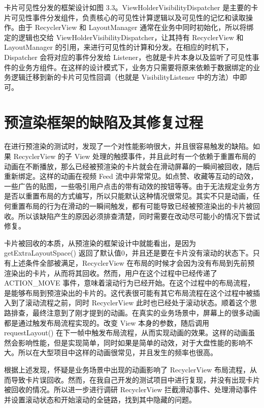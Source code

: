 
卡片可见性分发的框架设计如图 3.3。ViewHolderVisibilityDispatcher 是主要的卡片可见性事件分发组件，负责核心的可见性计算逻辑以及可见性的记忆和读取操作。由于 RecyclerView 和 LayoutManager 通常在业务中同时初始化，所以将绑定的逻辑也交给 ViewHolderVisibilityDispatcher，让其持有 RecyclerView 和 LayoutManager 的引用，来进行可见性的计算和分发。在相应的时机下，Dispatcher 会将对应的事件分发给 Listener，也就是卡片本身以及监听了可见性事件的业务方组件。在这样的设计模式下，业务方只需要将原来依赖于数据绑定的业务逻辑迁移到新的卡片可见性回调（也就是 VisibilityListener 中的方法）中即可。

\section{预渲染框架的缺陷及其修复过程}

在进行预渲染的测试时，发现了一个对性能影响很大，并且很容易触发的缺陷。如果 RecyclerView 的子 View 处理的触摸事件，并且此时有一个依赖于重置布局的动画在不断播放，那么已经被预渲染的卡片就会在滑动屏幕的一瞬间被回收，随后重新绑定。这样的动画在视频 Feed 流中非常常见。如点赞、收藏等互动的动效，一些广告的贴图，一些吸引用户点击的带有动效的按钮等等。由于无法规定业务方是否以重置布局的方式编写，所以只能默认这种情况很常见。其实不只是动画，任何重置布局的行为在滑动的一瞬间触发，都有可能导致已经被预渲染出的卡片被回收。所以该缺陷产生的原因必须排查清楚，同时需要在改动尽可能小的情况下尝试修复。

卡片被回收的本质，从预渲染的框架设计中就能看出，是因为 getExtraLayoutSpace() 返回了默认值0，并且还是要在卡片没有滚动的状态下。只有上述条件全部被满足，RecyclerView 在布局的时候才会因为没有布局到先前预渲染出的卡片，从而将其回收。然而，用户在这个过程中已经传递了 ACTION\_MOVE 事件，意味着滚动行为已经开始。在这个过程中的布局流程，是能够布局到预渲染出的卡片的。这代表很可能有其它布局流程在这个过程中被插入到了滚动流程之前，同时 RecyclerView 此时也已经处于滚动状态。顺着这个思路排查，最终注意到了刚才提到的动画。在真实的业务场景中，屏幕上的很多动画都是通过触发布局流程实现的。改变 View 本身的参数，随后调用 requestLayout() 在下一帧中触发布局流程，从而实现动画的效果。这样的动画虽然会影响性能，但是实现简单，同时如果是简单的动效，对于大盘性能的影响不大。所以在大型项目中这样的动画很常见，并且发生的频率也很高。

根据上述发现，怀疑是业务场景中出现的动画影响了 RecyclerView 布局流程，从而导致卡片误回收。然而，在我自己开发的测试项目中进行复现，并没有出现卡片被回收的情况。所以进一步进行调研 RecyclerView 拦截滑动事件、处理滑动事件并设置滚动状态和开始滚动的全链路，找到其中隐藏的问题。

